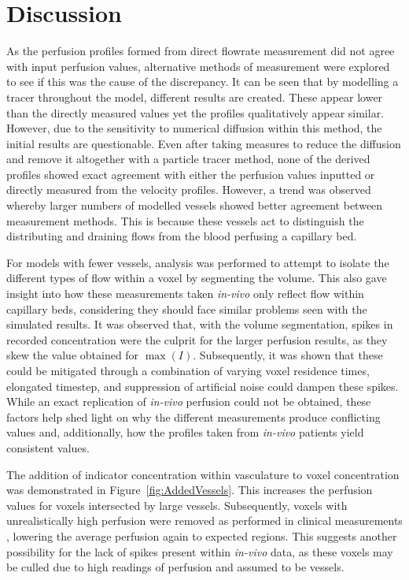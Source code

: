 \documentclass[11pt,english,a4paper,twoside,openright]{report}
\begin{document}
{{{{{{{\section[Discussion]{{\Large D}iscussion}

As the perfusion profiles formed from direct flowrate measurement did not agree with input perfusion values, alternative methods of measurement were explored to see if this was the cause of the discrepancy. It can be seen that by modelling a tracer throughout the model, different results are created. These appear lower than the directly measured values yet the profiles qualitatively appear similar. However, due to the sensitivity to numerical diffusion within this method, the initial results are questionable. Even after taking measures to reduce the diffusion and remove it altogether with a particle tracer method, none of the derived profiles showed exact agreement with either the perfusion values inputted or directly measured from the velocity profiles. However, a trend was observed whereby larger numbers of modelled vessels showed better agreement between measurement methods. This is because these vessels act to distinguish the distributing and draining flows from the blood perfusing a capillary bed. 

For models with fewer vessels, analysis was performed to attempt to isolate the different types of flow within a voxel by segmenting the volume. This also gave insight into how these measurements taken \textit{in-vivo} only reflect flow within capillary beds, considering they should face similar problems seen with the simulated results. It was observed that, with the volume segmentation, spikes in recorded concentration were the culprit for the larger perfusion results, as they skew the value obtained for $\max(I)$. Subsequently, it was shown that these could be mitigated through a combination of varying voxel residence times, elongated timestep, and suppression of artificial noise could dampen these spikes. While an exact replication of \textit{in-vivo} perfusion could not be obtained, these factors help shed light on why the different measurements produce conflicting values and, additionally, how the profiles taken from \textit{in-vivo} patients yield consistent values.

The addition of indicator concentration within vasculature to voxel concentration was demonstrated in Figure~\ref{fig:AddedVessels}. This increases the perfusion values for voxels intersected by large vessels. Subsequently, voxels with unrealistically high perfusion were removed as performed in clinical measurements \cite{teng2013improvements}, lowering the average perfusion again to expected regions. This suggests another possibility for the lack of spikes present within \textit{in-vivo} data, as these voxels may be culled due to high readings of perfusion and assumed to be vessels.

}}}}}}}
\end{document}
